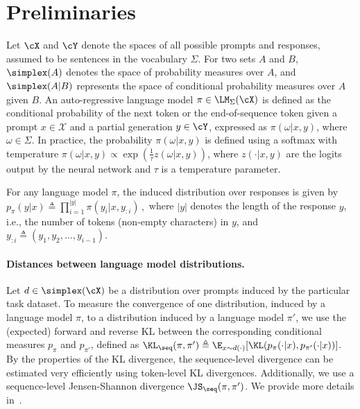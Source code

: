 \section{Preliminaries}\label{sec:preliminaries}


Let $\cX$ and $\cY$ denote the spaces of all possible prompts and responses, assumed to be sentences in the vocabulary $\Sigma$. For two sets \(A\) and \(B\), \(\simplex(A)\) denotes the space of probability measures over \(A\), and \(\simplex(A|B)\) represents the space of conditional probability measures over \(A\) given \(B\). An auto-regressive language model \(\pi \in \LM_{\Sigma}(\cX)\) is defined as the conditional probability of the next token or the end-of-sequence token given a prompt \(x \in \mathcal{X}\) and a partial generation \(y \in \cY\), expressed as \(\pi(\omega | x, y)\), where $\omega \in \Sigma$. In practice, the probability $\pi(\omega | x,y)$ is defined using a softmax with temperature $\pi(\omega | x,y) \propto \exp( \frac{1}{\tau}z(\omega| x, y))$, where $z(\cdot | x,y)$ are the logits output by the neural network and $\tau$ is a temperature parameter.

For any language model \(\pi\), the induced distribution over responses is given by
$
    p_{\pi}(y|x) \triangleq \prod_{i=1}^{|y|} \pi(y_i | x, y_{:i})\,,
$
where $|y|$ denotes the length of the response \(y\), i.e., the number of tokens (non-empty characters) in \(y\), and $y_{:i} \triangleq (y_1, y_2, \ldots, y_{i-1})$.


\paragraph{Distances between language model distributions.} Let $d \in \simplex(\cX)$ be a distribution over prompts induced by the particular task dataset. To measure the convergence of one distribution, induced by a language model $\pi$, to a distribution induced by a language model $\pi'$, we use the (expected) forward and reverse KL between the corresponding conditional measures $p_{\pi}$ and $p_{\pi'}$, defined as $\KL_{\seq}(\pi,  \pi') \triangleq \E_{x \sim d(\cdot)}[\KL(p_{\pi}(\cdot|x) , p_{\pi'}(\cdot|x))]$. By the properties of the KL divergence, the sequence-level divergence can be estimated very efficiently using token-level KL divergences. Additionally, we use a sequence-level Jensen-Shannon divergence $\JS_{\seq}(\pi, \pi')$. We provide more details in~.


